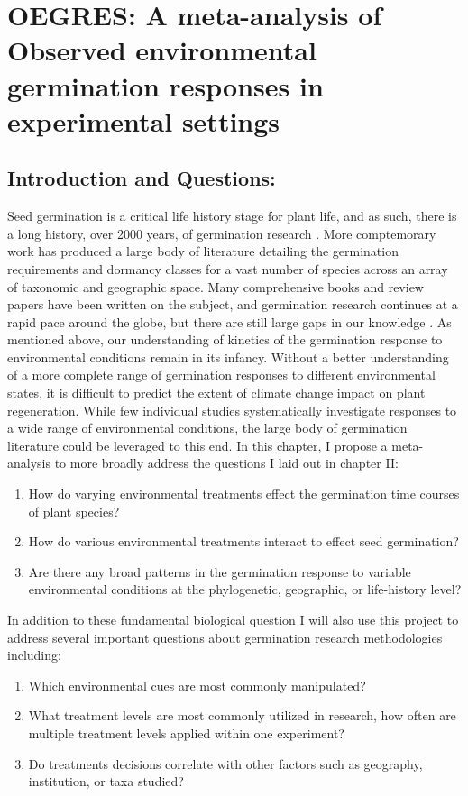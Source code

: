 \documentclass{article}\usepackage[]{graphicx}\usepackage[]{color}
\begin{document}
\section*{OEGRES: A meta-analysis of Observed environmental germination responses in experimental settings}
\subsection*{Introduction and Questions:}
\indent\indent Seed germination is a critical life history stage for plant life, and as such, there is a long history, over 2000 years, of germination research \citep{Baskin2014, Fenner2000}. More comptemorary work has produced a large body of literature detailing the germination requirements and dormancy classes for a vast number of species across an array of taxonomic and geographic space. Many comprehensive books and review papers have been written on the subject, and germination research continues at a rapid pace around the globe, but there are still large gaps in our knowledge \citep{Baskin2014}. As mentioned above, our understanding of  kinetics of the germination response to environmental conditions remain in its infancy.  Without a better understanding of a more complete range of germination responses to different environmental states, it is difficult to predict the extent of climate change impact on plant regeneration. While few individual studies systematically investigate responses to a wide range of environmental conditions, the large body of germination literature could be leveraged to this end. In this chapter, I propose a meta-analysis to more broadly address the questions I laid out in chapter II:
\begin{enumerate}
\item How do varying environmental treatments effect the germination time courses of plant species?
\item How do various environmental treatments interact to effect seed germination?
\item Are there any broad patterns in the germination response to variable environmental conditions at the phylogenetic, geographic, or life-history level?
\end{enumerate}
\indent\indent In addition to these fundamental biological question I will also use this project to address several important questions about germination research methodologies including:
\begin{enumerate}
\item Which environmental cues are most commonly manipulated?
\item What treatment levels are most commonly utilized in research, how often are multiple treatment levels applied within one experiment?
\item Do treatments decisions correlate with other factors such as geography, institution, or taxa studied?
\end{enumerate}
\end{document}
